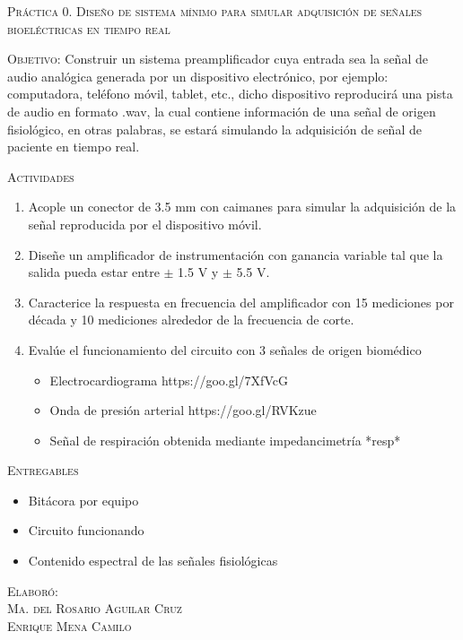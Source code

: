 \documentclass[10pt,letterpaper,spanish,twoside]{report}
\begin{document}
\docdate

\begin{center}
 \textsc{\asignatura}\vspace{.2em}
\end{center}

\textsc{Práctica 0. Diseño de sistema mínimo para simular adquisición de señales bioeléctricas en tiempo real}

\textsc{Objetivo:} Construir un sistema preamplificador cuya entrada sea la señal de audio analógica generada por un dispositivo electrónico, por ejemplo: computadora, teléfono móvil, tablet, etc., dicho dispositivo reproducirá una pista de audio en formato .wav, la cual contiene información de una señal de origen fisiológico, en otras palabras, se estará simulando la adquisición de señal de paciente en tiempo real.

\textsc{Actividades}
\begin{enumerate}
  \item Acople un conector de 3.5 mm con caimanes para simular la adquisición de la señal reproducida por el dispositivo móvil.
  \item Diseñe un amplificador de instrumentación con ganancia variable tal que la salida pueda estar entre $\pm$ 1.5 V y $\pm$ 5.5 V.
  \item Caracterice la respuesta en frecuencia del amplificador con 15 mediciones por década y 10 mediciones alrededor de la frecuencia de corte.
  \item Evalúe el funcionamiento del circuito con 3 señales de origen biomédico
  \begin{itemize}
  	\item Electrocardiograma https://goo.gl/7XfVcG
  	\item Onda de presión arterial https://goo.gl/RVKzue
  	\item Señal de respiración obtenida mediante  impedancimetría *resp*
  \end{itemize}
\end{enumerate}

\textsc{Entregables}
\begin{itemize}
  \item Bitácora por equipo
  \item Circuito funcionando
  \item Contenido espectral de las señales fisiológicas
\end{itemize}


\vfill
\begin{flushright}
\textsc{Elaboró:\\
Ma. del Rosario Aguilar Cruz\\
Enrique Mena Camilo}
\end{flushright}
\end{document}
